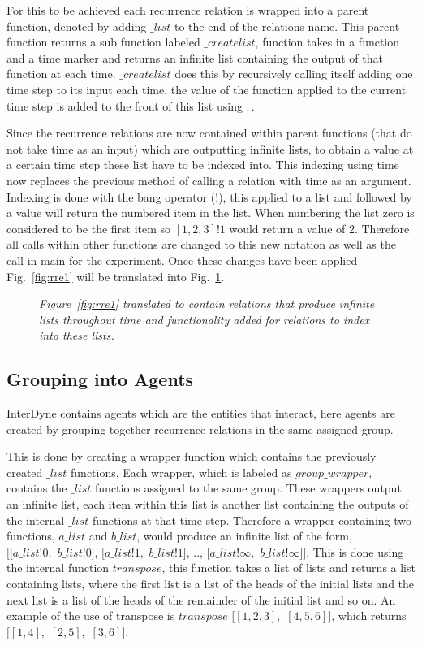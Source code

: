 \documentclass{article}
\begin{document}
For this to be achieved each recurrence relation is wrapped into a parent function, denoted by adding $\_list$ to the end of the relations name. This parent function returns a sub function labeled $\_createlist$, function takes in a function and a time marker and returns an infinite list containing the output of that function at each time. $\_createlist$ does this by recursively calling itself adding one time step to its input each time, the value of the function applied to the current time step is added to the front of this list using $:$.
 
Since the recurrence relations are now contained within parent functions (that do not take time as an input) which are outputting infinite lists, to obtain a value at a certain time step these list have to be indexed into. This indexing using time now replaces the previous method of calling a relation with time as an argument. Indexing is done with the bang operator ($!$), this applied to a list and followed by a value will return the numbered item in the list. When numbering the list zero is considered to be the first item so $[1,2,3]!1$ would return a value of $2$. Therefore all calls within other functions are changed to this new notation as well as the call in main for the experiment. Once these changes have been applied Fig.~\ref{fig:rre1} will be translated into Fig.~\ref{fig:ts1}.
\begin{figure}[H]
	\centering
	
	\caption{\it Figure~\ref{fig:rre1} translated to contain relations that produce infinite lists throughout time and functionality added for relations to index into these lists.}
	\label{fig:ts1}
\end{figure} 




\subsection{Grouping into Agents}
InterDyne contains agents which are the entities that interact, here agents are created by grouping together recurrence relations in the same assigned group.  

This is done by creating a wrapper function which contains the previously created $\_list$ functions. Each wrapper, which is labeled as $group\_wrapper$, contains the $\_list$ functions assigned to the same group. These wrappers output an infinite list, each item within this list is another list containing the outputs of the internal $\_list$ functions at that time step. Therefore a wrapper containing two functions, $a\_list$ and $b\_list$, would produce an infinite list of the form,\\
$[[a\_list!0,$ $b\_list!0]$, $[a\_list!1,$ $b\_list!1]$, .., $[a\_list!\infty,$ $b\_list!\infty]]$. This is done using the internal function $transpose$, this function takes a list of lists and returns a list containing lists, where the first list is a list of the heads of the initial lists and the next list is a list of the heads of the remainder of the initial list and so on. An example of the use of transpose is $transpose$ $[[1,2,3],$ $[4,5,6]]$, which returns $[[1,4],$ $[2,5],$ $[3,6]]$.
\end{document}
